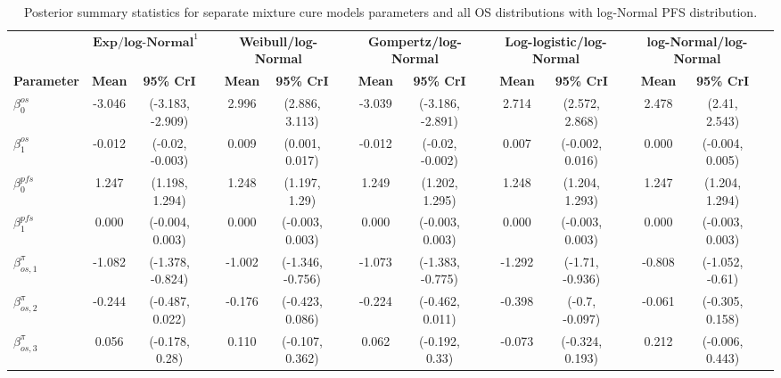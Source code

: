 \documentclass[AMA,STIX1COL]{WileyNJD-v2}
\begin{document}
\begin{landscape}
\begin{center}
\begin{table}[t]
\caption{Posterior summary statistics for separate mixture cure models parameters and all OS distributions with log-Normal PFS distribution. \label{tab:post_sep_pfs_lnormal}}
\centering
\begin{tabular}{l c c c c c c c c c c c c c c c}
\toprule
\multicolumn{1}{l}{} & \multicolumn{2}{c}{$\textbf{Exp/log-Normal}^1$} & & \multicolumn{2}{c}{\textbf{Weibull/log-Normal}} & & \multicolumn{2}{c}{\textbf{Gompertz/log-Normal}} & & \multicolumn{2}{c}{\textbf{Log-logistic/log-Normal}} & & \multicolumn{2}{c}{\textbf{log-Normal/log-Normal}}\\
\cmidrule{2-3}\cmidrule{5-6}\cmidrule{8-9}\cmidrule{11-12}\cmidrule{14-15}
\textbf{Parameter} & \textbf{Mean} & \textbf{95\% CrI} & & \textbf{Mean} & \textbf{95\% CrI} & & \textbf{Mean} & \textbf{95\% CrI} & & \textbf{Mean} & \textbf{95\% CrI} & & \textbf{Mean} & \textbf{95\% CrI}\\
\midrule
$\beta^{os}_0$ & -3.046 & (-3.183, -2.909) &  & 2.996 & (2.886, 3.113) &  & -3.039 & (-3.186, -2.891) &  & 2.714 & (2.572, 2.868) &  & 2.478 & (2.41, 2.543) & \\
$\beta^{os}_1$ & -0.012 & (-0.02, -0.003) &  & 0.009 & (0.001, 0.017) &  & -0.012 & (-0.02, -0.002) &  & 0.007 & (-0.002, 0.016) &  & 0.000 & (-0.004, 0.005) & \\
$\beta^{pfs}_0$ & 1.247 & (1.198, 1.294) &  & 1.248 & (1.197, 1.29) &  & 1.249 & (1.202, 1.295) &  & 1.248 & (1.204, 1.293) &  & 1.247 & (1.204, 1.294) & \\
$\beta^{pfs}_1$ & 0.000 & (-0.004, 0.003) &  & 0.000 & (-0.003, 0.003) &  & 0.000 & (-0.003, 0.003) &  & 0.000 & (-0.003, 0.003) &  & 0.000 & (-0.003, 0.003) & \\
$\beta^{\pi}_{os, 1}$ & -1.082 & (-1.378, -0.824) &  & -1.002 & (-1.346, -0.756) &  & -1.073 & (-1.383, -0.775) &  & -1.292 & (-1.71, -0.936) &  & -0.808 & (-1.052, -0.61) & \\
$\beta^{\pi}_{os, 2}$ & -0.244 & (-0.487, 0.022) &  & -0.176 & (-0.423, 0.086) &  & -0.224 & (-0.462, 0.011) &  & -0.398 & (-0.7, -0.097) &  & -0.061 & (-0.305, 0.158) & \\
$\beta^{\pi}_{os, 3}$ & 0.056 & (-0.178, 0.28) &  & 0.110 & (-0.107, 0.362) &  & 0.062 & (-0.192, 0.33) &  & -0.073 & (-0.324, 0.193) &  & 0.212 & (-0.006, 0.443) & \\

\end{tabular}
\end{table}
\end{center}
\end{landscape}
\end{document}
